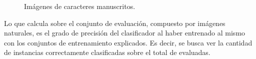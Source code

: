 \begin{itemize}
		\begin{figure}[htbp]
			\centering
			\caption[Chars74k manuscritas]{Imágenes de caracteres manuscritos.}
			\label{fig: chars74k-hand}
		\end{figure}
		
	\end{itemize}		
	
	Lo que calcula sobre el conjunto de evaluación, compuesto por imágenes naturales, es el grado de precisión del clasificador al haber entrenado al mismo con los conjuntos de entrenamiento explicados. Es decir, se busca ver la cantidad de instancias correctamente clasificadas sobre el total de evaluadas.
	
